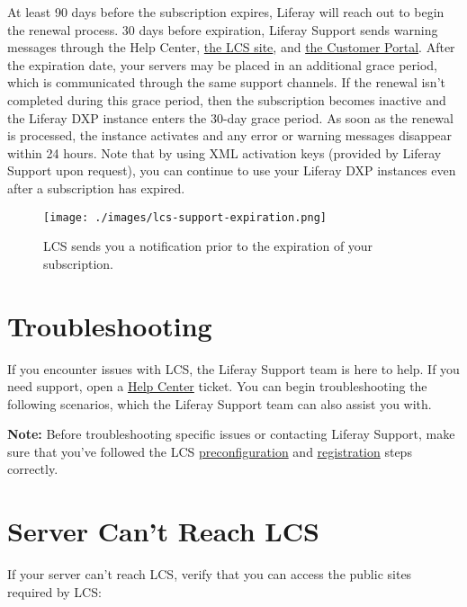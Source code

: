 At least 90 days before the subscription expires, Liferay will reach out
to begin the renewal process. 30 days before expiration, Liferay Support
sends warning messages through the Help Center,
\href{https://lcs.liferay.com}{the LCS site}, and
\href{https://www.liferay.com/group/customer}{the Customer Portal}.
After the expiration date, your servers may be placed in an additional
grace period, which is communicated through the same support channels.
If the renewal isn't completed during this grace period, then the
subscription becomes inactive and the Liferay DXP instance enters the
30-day grace period. As soon as the renewal is processed, the instance
activates and any error or warning messages disappear within 24 hours.
Note that by using XML activation keys (provided by Liferay Support upon
request), you can continue to use your Liferay DXP instances even after
a subscription has expired.

\begin{figure}
\centering
\texttt{[image: ./images/lcs-support-expiration.png]}
\caption{LCS sends you a notification prior to the expiration of your
subscription.}
\end{figure}

\section{Troubleshooting}\label{troubleshooting}

If you encounter issues with LCS, the Liferay Support team is here to
help. If you need support, open a
\href{https://help.liferay.com/hc}{Help Center} ticket. You can begin
troubleshooting the following scenarios, which the Liferay Support team
can also assist you with.

\noindent\hrulefill

\textbf{Note:} Before troubleshooting specific issues or contacting
Liferay Support, make sure that you've followed the LCS
\href{/docs/7-2/deploy/-/knowledge_base/d/lcs-preconfiguration}{preconfiguration}
and
\href{/docs/7-2/deploy/-/knowledge_base/d/activating-your-liferay-dxp-server-with-lcs}{registration}
steps correctly.

\noindent\hrulefill

\section{Server Can't Reach LCS}\label{server-cant-reach-lcs}

If your server can't reach LCS, verify that you can access the public
sites required by LCS:

